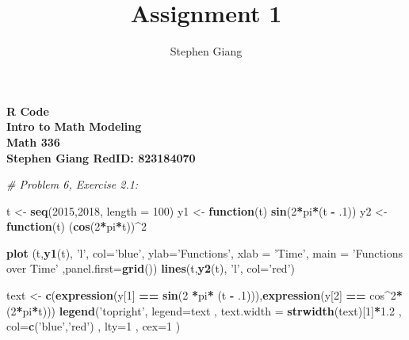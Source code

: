 \documentclass[
]{article}
\title{Assignment 1}
\author{Stephen Giang}
\date{}
\newenvironment{Shaded}{\begin{snugshade}}{\end{snugshade}}
\newcommand{\CommentTok}[1]{\textcolor[rgb]{0.56,0.35,0.01}{\textit{#1}}}
\newcommand{\ControlFlowTok}[1]{\textcolor[rgb]{0.13,0.29,0.53}{\textbf{#1}}}
\newcommand{\DataTypeTok}[1]{\textcolor[rgb]{0.13,0.29,0.53}{#1}}
\newcommand{\DecValTok}[1]{\textcolor[rgb]{0.00,0.00,0.81}{#1}}
\newcommand{\FloatTok}[1]{\textcolor[rgb]{0.00,0.00,0.81}{#1}}
\newcommand{\KeywordTok}[1]{\textcolor[rgb]{0.13,0.29,0.53}{\textbf{#1}}}
\newcommand{\NormalTok}[1]{#1}
\newcommand{\OperatorTok}[1]{\textcolor[rgb]{0.81,0.36,0.00}{\textbf{#1}}}
\newcommand{\StringTok}[1]{\textcolor[rgb]{0.31,0.60,0.02}{#1}}
\begin{document}
	\begin{center}
	\textbf{R Code} \\
	\textbf{Intro to Math Modeling} \\
	\textbf{Math 336} \\
	\textbf{Stephen Giang RedID: 823184070} \\ 
	\vspace{\baselineskip}
	\vspace{\baselineskip}
	\end{center}

\begin{Shaded}
\begin{Highlighting}[]
\CommentTok{# Problem 6, Exercise 2.1:}

\NormalTok{t <-}\StringTok{ }\KeywordTok{seq}\NormalTok{(}\DecValTok{2015}\NormalTok{,}\DecValTok{2018}\NormalTok{, }\DataTypeTok{length =} \DecValTok{100}\NormalTok{)}
\NormalTok{y1 <-}\StringTok{ }\ControlFlowTok{function}\NormalTok{(t) }\KeywordTok{sin}\NormalTok{(}\DecValTok{2}\OperatorTok{*}\NormalTok{pi}\OperatorTok{*}\NormalTok{(t }\OperatorTok{-}\StringTok{ }\FloatTok{.1}\NormalTok{))}
\NormalTok{y2 <-}\StringTok{ }\ControlFlowTok{function}\NormalTok{(t) (}\KeywordTok{cos}\NormalTok{(}\DecValTok{2}\OperatorTok{*}\NormalTok{pi}\OperatorTok{*}\NormalTok{t))}\OperatorTok{^}\DecValTok{2}

\KeywordTok{plot}\NormalTok{ (t,}\KeywordTok{y1}\NormalTok{(t), }\StringTok{'l'}\NormalTok{, }\DataTypeTok{col=}\StringTok{'blue'}\NormalTok{, }\DataTypeTok{ylab=}\StringTok{'Functions'}\NormalTok{, }\DataTypeTok{xlab =} \StringTok{'Time'}\NormalTok{, }
      \DataTypeTok{main =} \StringTok{'Functions over Time'}\NormalTok{ ,}\DataTypeTok{panel.first=}\KeywordTok{grid}\NormalTok{())}
\KeywordTok{lines}\NormalTok{(t,}\KeywordTok{y2}\NormalTok{(t), }\StringTok{'l'}\NormalTok{, }\DataTypeTok{col=}\StringTok{'red'}\NormalTok{)}

\NormalTok{text <-}\StringTok{ }\KeywordTok{c}\NormalTok{(}\KeywordTok{expression}\NormalTok{(y[}\DecValTok{1}\NormalTok{] }\OperatorTok{==}\StringTok{ }\KeywordTok{sin}\NormalTok{(}\DecValTok{2} \OperatorTok{*}\NormalTok{pi}\OperatorTok{*}\StringTok{ }\NormalTok{(t }\OperatorTok{-}\StringTok{ }\FloatTok{.1}\NormalTok{))),}\KeywordTok{expression}\NormalTok{(y[}\DecValTok{2}\NormalTok{] }\OperatorTok{==}\StringTok{ }\NormalTok{cos}\OperatorTok{^}\DecValTok{2}\OperatorTok{*}\NormalTok{(}\DecValTok{2}\OperatorTok{*}\NormalTok{pi}\OperatorTok{*}\NormalTok{t)))}
\KeywordTok{legend}\NormalTok{(}\StringTok{'topright'}\NormalTok{, }\DataTypeTok{legend=}\NormalTok{text , }\DataTypeTok{text.width =} \KeywordTok{strwidth}\NormalTok{(text)[}\DecValTok{1}\NormalTok{]}\OperatorTok{*}\FloatTok{1.2}\NormalTok{ , }
       \DataTypeTok{col=}\KeywordTok{c}\NormalTok{(}\StringTok{'blue'}\NormalTok{,}\StringTok{'red'}\NormalTok{) , }\DataTypeTok{lty=}\DecValTok{1}\NormalTok{ , }\DataTypeTok{cex=}\DecValTok{1}\NormalTok{ )}
\end{Highlighting}
\end{Shaded}
\end{document}
